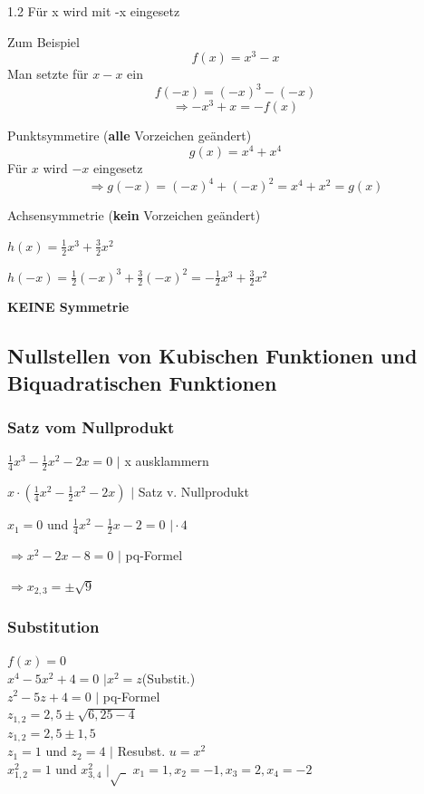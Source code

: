 \documentclass{article}
\newcommand{\Zeilenabstand}{1.2}
\begin{document}
\begin{spacing}{\Zeilenabstand}
    Für x wird mit -x eingesetz

    Zum Beispiel
    \begin{equation}
        f(x) = x^3 -x
    \end{equation}
    Man setzte für $x -x$ ein
    \begin{equation}
        f(-x) = (-x)^{3} -(-x) 
    \end{equation}
    \begin{equation}
        \Rightarrow -x^{3} + x = -f(x)
    \end{equation}

    Punktsymmetire (\textbf{alle} Vorzeichen geändert)
    \begin{equation}
        g(x) = x^4 + x^{4}
    \end{equation}
    Für $x$ wird $-x$ eingesetz
    \begin{equation}
        \Rightarrow g(-x) = (-x)^{4} + (-x)^{2} = x^{4} + x^{2} = g(x) 
    \end{equation}

    Achsensymmetrie (\textbf{kein} Vorzeichen geändert)
    \vspace{5mm}

    $ h(x) =\frac{1}{2} x^3 + \frac{3}{2}x^2$

    $ h(-x) = \frac{1}{2} (-x)^3 + \frac{3}{2} (-x)^2 = -\frac{1}{2}x^3 + \frac{3}{2}x^2$

    \textbf{KEINE Symmetrie}

    \subsection{Nullstellen von Kubischen Funktionen und Biquadratischen Funktionen}
    \subsubsection{Satz vom Nullprodukt}
    $ \frac{1}{4}x^3 -\frac{1}{2}x^2-2x=0$ $\vert$ x ausklammern

    $x \cdot (\frac{1}{4}x^2-\frac{1}{2}x^2-2x) $ $\vert$ Satz v. Nullprodukt

    $x_1 = 0$ und $\frac{1}{4}x^2-\frac{1}{2}x-2=0$ $\vert \cdot 4$

    $\Rightarrow x^2 - 2x - 8 = 0 $ $\vert$ pq-Formel

    $\Rightarrow x_{2,3} = \pm \sqrt{9}$

    \subsubsection{Substitution}   
    $f(x)=0$\\
    $x^4-5x^2+4 = 0$ $\vert x^2 = z$(Substit.)\\
    $z^2-5z+4=0$ $\vert$ pq-Formel\\
    $z_{1,2} = 2,5 \pm \sqrt{6,25-4}$\\
    $z_{1,2} = 2,5 \pm 1,5$\\
    $z_1 = 1$ und $z_2 = 4$ $\vert$ Resubst. $u=x^2$\\
    $x^2_{1,2} = 1$ und $x^2_{3,4}$ $\vert \sqrt{\ \ }$
    $x_1 = 1,x_2=-1,x_3=2,x_4=-2$



\end{spacing}
\end{document}
